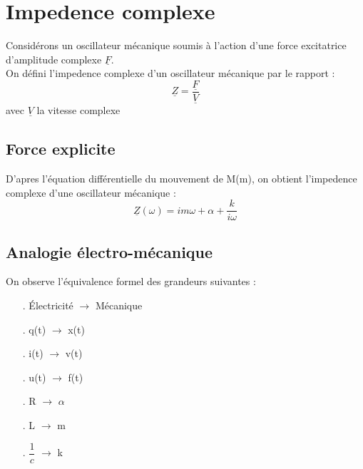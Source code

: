 \section{Impedence complexe}
\begin{de}
Considérons un oscillateur mécanique soumis à l'action d'une force excitatrice d'amplitude complexe $\underline{F}$.\\
On défini l'impedence complexe d'un oscillateur mécanique par le rapport :
$$\underline{Z} = \dfrac{\underline{F}}{\underline{V}}$$
avec $\underline{V}$ la vitesse complexe
\end{de}
\subsection{Force explicite}
D'apres l'équation différentielle du mouvement de M(m), on obtient l'impedence complexe d'une oscillateur mécanique :
$$\underline{Z}(\omega) = im\omega + \alpha + \dfrac{k}{i\omega}$$
\subsection{Analogie électro-mécanique}
On observe l'équivalence formel des grandeurs suivantes :\\
\begin{itemize}
 \item[$.$] Électricité $\rightarrow$ Mécanique\\
  \item[$.$] q(t) $\rightarrow$ x(t)\\
 \item[$.$] i(t) $\rightarrow$ v(t)\\
 \item[$.$] u(t) $\rightarrow$ f(t)\\
 \item[$.$] R $\rightarrow$ $\alpha$\\
 \item[$.$] L $\rightarrow$ m\\
 \item[$.$] $\dfrac{1}{c}$ $\rightarrow$ k\\
\end{itemize}
